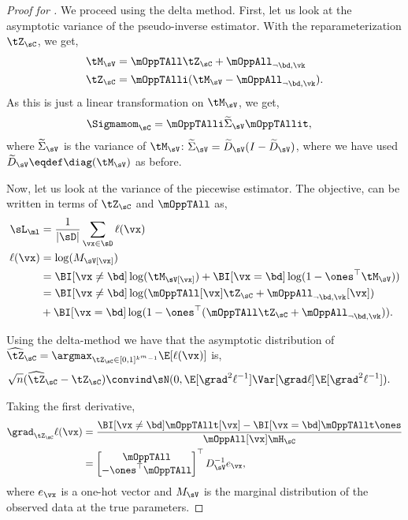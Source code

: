\begin{proof}[Proof for ]
  We proceed using the delta method. First, let us look at the
  asymptotic variance of the pseudo-inverse estimator. With the
  reparameterization $\tZ_\sC$, we get,
  \begin{align*}
    \tM_\sV &= \mOppTAll \tZ_\sC + \mOppAll_{\neg \bd, \vk} \\
    \tZ_\sC &= \mOppTAlli (\tM_\sV - \mOppAll_{\neg \bd, \vk}).
  \end{align*}
  As this is just a linear transformation on $\tM_\sV$, we get,
  \begin{align*}
      \Sigmamom_{\sC} &= \mOppTAlli \widetilde\Sigma_\sV \mOppTAllit,
  \end{align*}
  where $\widetilde\Sigma_\sV$ is the variance of $\tM_\sV$: $\widetilde\Sigma_\sV = \widetilde{D}_\sV
  (I - \widetilde{D}_\sV)$, where we have used $\widetilde D_\sV \eqdef \diag(\tM_\sV)$ as
  before.

  Now, let us look at the variance of the piecewise estimator.  The
  objective,  can be written in terms of
  $\tZ_\sC$ and $\mOppTAll$ as,
  \begin{align*}
    \sL_\ml &= \frac{1}{|\sD|} \sum_{\vx \in \sD} \ell(\vx) \\
    \ell(\vx) 
              &= \log(M_\sV[\vx]) \\
              &= \BI[\vx \neq \bd] \log(\tM_\sV[\vx]) + \BI[\vx = \bd] \log(1 - \ones^\top \tM_\sV) ) \\
              &= \BI[\vx \neq \bd] \log(\mOppTAll[\vx] \tZ_\sC + \mOppAll_{\neg \bd, \vk}[\vx]) \\
              &+ \BI[\vx = \bd] \log(1 - \ones^\top (\mOppTAll \tZ_\sC + \mOppAll_{\neg \bd, \vk})).
  \end{align*}

Using the delta-method \cite{vaart98asymptotic} we have that the asymptotic distribution of 
  $\widehat{{\tZ}}_\sC = \argmax_{\tZ_\sC \in [0,1]^{k^m-1}} \E[\ell(\vx)]$ is,
  \begin{align*}
    \sqrt{n}(\widehat{{\tZ}}_{\sC} - {\tZ}_{\sC}) 
      &\convind \sN( 0, \E[\grad^2 \ell^{-1}] \Var[\grad \ell] \E[\grad^2 \ell^{-1}]).
  \end{align*}

Taking the first derivative,
\begin{align}
  \grad_{\tZ_\sC} \ell(\vx)
  &= 
  \frac{\BI[\vx \neq \bd] \mOppTAllt[\vx] - \BI[\vx = \bd] \mOppTAllt \ones}{\mOppAll[\vx] \mH_\sC} 
  \nonumber \\ 
  &= 
  \begin{bmatrix}
    \mOppTAll \\
    -\ones^\top \mOppTAll
  \end{bmatrix}^\top
  D_{\sV}^{-1} e_\vx, \label{eqn:lhood-grad}
\end{align}
where $e_\vx$ is a one-hot vector and $M_\sV$ is the marginal
distribution of the observed data at the true parameters.


\end{proof}
